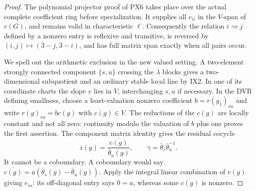 \begin{proof}
The polynomial projector proof of PX6 takes place over the
actual complete coefficient ring before specialization.
It supplies all $e_{ii}$ in the $V$-span of $r(G)$, and
remains valid in characteristic $\ell$.  Consequently the
relation $i\rightsquigarrow j$ defined by a nonzero entry
is reflexive and transitive, is reversed by
$(i,j)\mapsto(3-j,3-i)$, and has full matrix span exactly
when all pairs occur.

We spell out the arithmetic exclusion in the new valued
setting.  A two-element strongly connected component
$\{s,u\}$ crossing the $\lambda$ blocks gives a
two-dimensional subquotient and an ordinary stable local
line by IX2.  In one of its coordinate charts the slope
$v$ lies in $V$, interchanging $s,u$ if necessary.
In the DVR defining smallness, choose a least-valuation
nonzero coefficient $b=r(g_1)_{su}$ and write
$r(g)_{su}=b c(g)$ with $c(g)\in V$.
The reductions of the $c(g)$ are locally constant and
not all zero: continuity modulo the valuation of $b$
plus one proves the first assertion.  The component
matrix identity gives the residual cocycle
\[
 z(g)=\frac{\overline{c(g)}}{\bar\theta_u(g)},
 \qquad \gamma=\bar\theta_s\bar\theta_u^{-1}.
 \tag{IX.7}
\]
It cannot be a coboundary.  A coboundary would say
$\overline{c(g)}=a(\bar\theta_s(g)-\bar\theta_u(g))$.
Apply the integral linear combination of $r(g)$ giving
$e_{ss}$: its off-diagonal entry says $0=a$, whereas some
$\overline{c(g)}$ is nonzero.


\end{proof}
